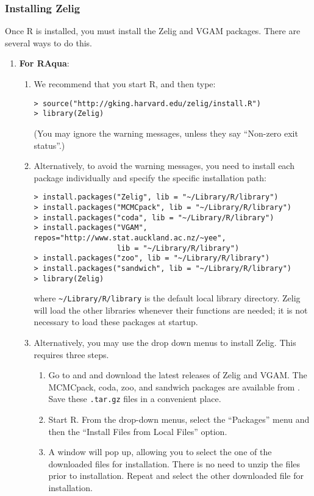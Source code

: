 \subsubsection{Installing Zelig}\label{osx.manual}

Once R is installed, you must install the Zelig and VGAM packages.
There are several ways to do this.
\begin{enumerate}
\item {\bf For RAqua}:
  \begin{enumerate}
    
  \item We recommend that you start R, and then type:
\begin{verbatim}
> source("http://gking.harvard.edu/zelig/install.R")
> library(Zelig)
\end{verbatim}
(You may ignore the warning messages, unless they say ``Non-zero exit 
status''.)
\item Alternatively, to avoid the warning messages, you need to install 
each package individually and specify the specific installation path:
\begin{verbatim}
> install.packages("Zelig", lib = "~/Library/R/library")
> install.packages("MCMCpack", lib = "~/Library/R/library")
> install.packages("coda", lib = "~/Library/R/library")
> install.packages("VGAM", repos="http://www.stat.auckland.ac.nz/~yee", 
                   lib = "~/Library/R/library")
> install.packages("zoo", lib = "~/Library/R/library")
> install.packages("sandwich", lib = "~/Library/R/library")
> library(Zelig)
\end{verbatim}
    where \texttt{\~{}/Library/R/library} is the default local library
    directory. Zelig will load the other libraries whenever their functions
    are needed; it is not necessary to load these packages at startup.
    
  \item Alternatively, you may use the drop down menus to install
    Zelig.  This requires three steps.  
  \begin{enumerate} 
  \item Go to  and 
    and download the latest releases of Zelig and VGAM.  The MCMCpack,
coda, zoo, and sandwich packages are available from
.
Save these \texttt{.tar.gz} files in a convenient place.
  \item Start R.  From the drop-down menus, select the ``Packages''
    menu and then the ``Install Files from Local Files'' option.
  \item A window will pop up, allowing you to select the one of the
    downloaded files for installation.  There is no need to unzip
    the files prior to installation.  Repeat and select the other
    downloaded file for installation.
  \end{enumerate} 
  

\end{enumerate}
\end{enumerate}
